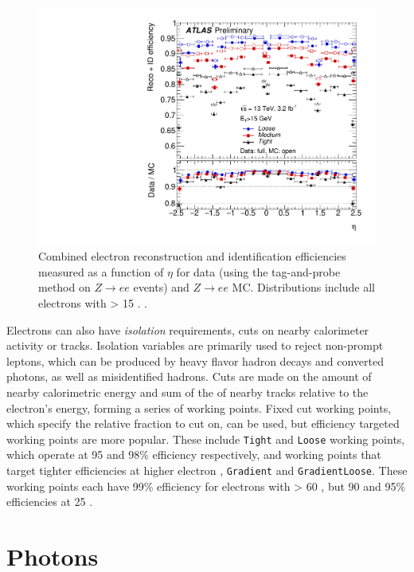 \begin{centering}
\begin{figure}[!hbt]
\myfloatalign
\includegraphics[width=.90\linewidth]{figures/reco/fig_14b.pdf}
\caption{ Combined electron reconstruction and identification efficiencies measured as a function of $\eta$ for data (using the tag-and-probe method on $Z\rightarrow ee$ events) and $Z\rightarrow ee$ \ac{MC}. Distributions include all electrons with \et > 15 \gev. \cite{ATLAS-CONF-2016-024}.}
\label{fig:reco_el_sf}
\end{figure}
\end{centering}

Electrons can also have \textit{isolation} requirements, cuts on nearby calorimeter activity or tracks. Isolation variables are primarily used to reject non-prompt leptons, which can be produced by heavy flavor hadron decays and converted photons, as well as misidentified hadrons. Cuts are made on the amount of nearby calorimetric energy and sum of the \pt of nearby tracks relative to the electron's energy, forming a series of working points. Fixed cut working points, which specify the relative fraction to cut on, can be used, but efficiency targeted working points are more popular. These include \texttt{Tight} and \texttt{Loose} working points, which operate at 95 and 98\% efficiency respectively, and working points that target tighter efficiencies at higher electron \pt, \texttt{Gradient} and \texttt{GradientLoose}. These working points each have 99\% efficiency for electrons with \pt > 60 \gev, but 90 and 95\% efficiencies at 25 \gev. 

\section{Photons}
\label{sec:reco_photons}

